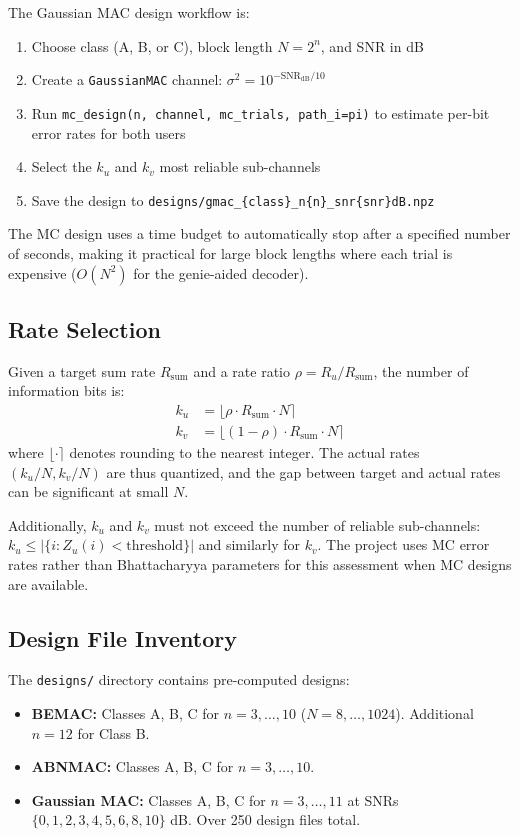 \documentclass[11pt,a4paper]{article}
\begin{document}
The Gaussian MAC design workflow is:
\begin{enumerate}
  \item Choose class (A, B, or C), block length $N = 2^n$, and SNR in dB
  \item Create a \texttt{GaussianMAC} channel: $\sigma^2 = 10^{-\text{SNR}_{\text{dB}}/10}$
  \item Run \texttt{mc\_design(n, channel, mc\_trials, path\_i=pi)} to
        estimate per-bit error rates for both users
  \item Select the $k_u$ and $k_v$ most reliable sub-channels
  \item Save the design to \texttt{designs/gmac\_\{class\}\_n\{n\}\_snr\{snr\}dB.npz}
\end{enumerate}

The MC design uses a time budget to automatically stop after a specified
number of seconds, making it practical for large block lengths where each
trial is expensive ($O(N^2)$ for the genie-aided decoder).

\subsection{Rate Selection}

Given a target sum rate $R_{\text{sum}}$ and a rate ratio $\rho = R_u / R_{\text{sum}}$,
the number of information bits is:
\begin{align}
  k_u &= \lfloor \rho \cdot R_{\text{sum}} \cdot N \rceil \\
  k_v &= \lfloor (1 - \rho) \cdot R_{\text{sum}} \cdot N \rceil
\end{align}
where $\lfloor \cdot \rceil$ denotes rounding to the nearest integer.
The actual rates $(k_u/N, k_v/N)$ are thus quantized, and the gap between
target and actual rates can be significant at small $N$.

Additionally, $k_u$ and $k_v$ must not exceed the number of reliable
sub-channels: $k_u \leq |\{i : Z_u(i) < \text{threshold}\}|$ and similarly
for $k_v$. The project uses MC error rates rather than Bhattacharyya
parameters for this assessment when MC designs are available.

\subsection{Design File Inventory}

The \texttt{designs/} directory contains pre-computed designs:
\begin{itemize}
  \item \textbf{BEMAC:} Classes A, B, C for $n = 3, \ldots, 10$ ($N = 8, \ldots, 1024$). Additional $n = 12$ for Class B.
  \item \textbf{ABNMAC:} Classes A, B, C for $n = 3, \ldots, 10$.
  \item \textbf{Gaussian MAC:} Classes A, B, C for $n = 3, \ldots, 11$ at SNRs $\{0, 1, 2, 3, 4, 5, 6, 8, 10\}$ dB. Over 250 design files total.
\end{itemize}
\end{document}
